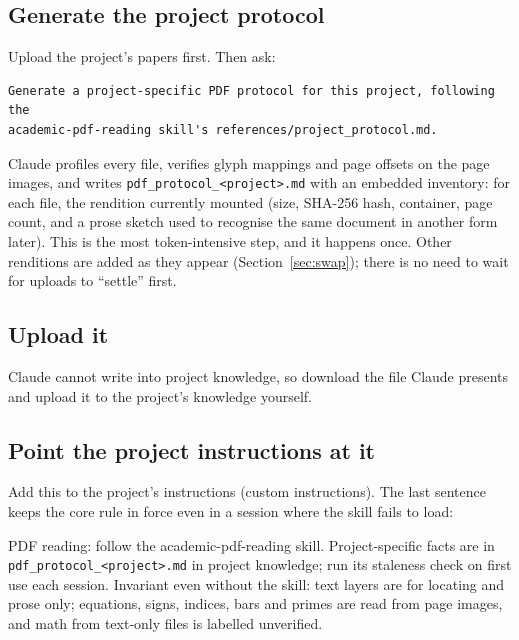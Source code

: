 \documentclass[11pt,a4paper]{article}
\newcommand{\file}[1]{\texttt{#1}}
\begin{document}
\subsection{Generate the project protocol}

Upload the project's papers first. Then ask:
\begin{lstlisting}
Generate a project-specific PDF protocol for this project, following the
academic-pdf-reading skill's references/project_protocol.md.
\end{lstlisting}
Claude profiles every file, verifies glyph mappings and page offsets on the
page images, and writes \file{pdf\_protocol\_<project>.md} with an embedded
inventory: for each file, the rendition currently mounted (size, SHA-256
hash, container, page count, and a prose sketch used to recognise the same
document in another form later). This is the most token-intensive step, and
it happens once. Other renditions are added as they appear
(Section~\ref{sec:swap}); there is no need to wait for uploads to
``settle'' first.

\subsection{Upload it}

Claude cannot write into project knowledge, so download the file Claude
presents and upload it to the project's knowledge yourself.

\subsection{Point the project instructions at it}\label{sec:pointer}

Add this to the project's instructions (custom instructions). The last
sentence keeps the core rule in force even in a session where the skill
fails to load:

\begin{tcolorbox}[colback=codebg, colframe=codebg, arc=2pt, left=6pt, right=6pt]
\small\raggedright
PDF reading: follow the academic-pdf-reading skill. Project-specific facts
are in \texttt{pdf\_protocol\_<project>.md} in project knowledge; run its
staleness check on first use each session. Invariant even without the
skill: text layers are for locating and prose only; equations, signs,
indices, bars and primes are read from page images, and math from text-only
files is labelled unverified.
\end{tcolorbox}
\end{document}
